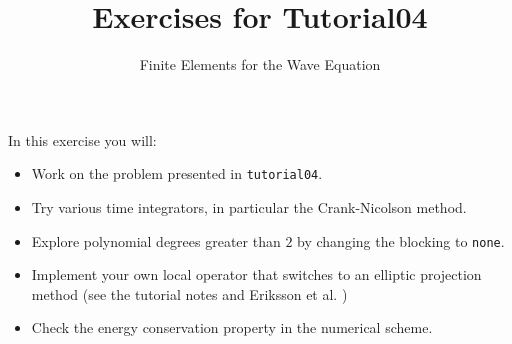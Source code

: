 \documentclass[12pt,a4paper]{article}
\title{\textbf{Exercises for Tutorial04}}
\subtitle{Finite Elements for the Wave  Equation}
\begin{document}
\exerciseheader

In this exercise you will:
\begin{itemize}
\item Work on the problem presented in \lstinline{tutorial04}.
\item Try various time integrators, in particular the Crank-Nicolson method.
\item Explore polynomial degrees greater than $2$ by changing the blocking
to \lstinline{none}.
\item Implement your own local operator that switches to an elliptic projection method (see the tutorial notes and Eriksson et al. \cite{Eriksson})
\item Check the energy conservation property in the numerical scheme.
\end{itemize}
\end{document}
